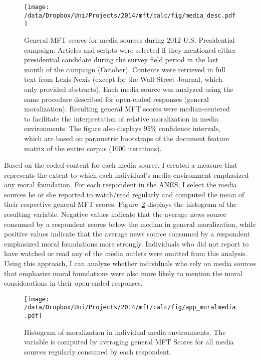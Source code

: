 \begin{figure}[ht]\centering
\texttt{[image: /data/Dropbox/Uni/Projects/2014/mft/calc/fig/media\_desc.pdf]}
\caption[General MFT scores for media sources during 2012 U.S. Presidential campaign]{General MFT scores for media sources during 2012 U.S. Presidential campaign. Articles and scripts were selected if they mentioned either presidential candidate during the survey field period in the last month of the campaign (October). Contents were retrieved in full text from Lexis-Nexis (except for the Wall Street Journal, which only provided abstracts). Each media source was analyzed using the same procedure described for open-ended responses (general moralization). Resulting general MFT scores were median-centered to facilitate the interpretation of relative moralization in media environments. The figure also displays 95\% confidence intervals, which are based on parametric bootstraps of the document feature matrix of the entire corpus (1000 iterations).}\label{fig:media_desc}
\end{figure}


Based on the coded content for each media source, I created a measure that represents the extent to which each individual's media environment emphasized any moral foundation. For each respondent in the ANES, I select the media sources he or she reported to watch/read regularly and computed the mean of their respective general MFT scores. Figure~\ref{fig:moralmedia} displays the histogram of the resulting variable. Negative values indicate that the average news source consumed by a respondent scores below the median in general moralization, while positive values indicate that the average news source consumed by a respondent emphasized moral foundations more strongly. Individuals who did not report to have watched or read any of the media outlets were omitted from this analysis. Using this approach, I can analyze whether individuals who rely on media sources that emphasize moral foundations were also more likely to mention the moral considerations in their open-ended responses. 

\begin{figure}[ht]\centering
\texttt{[image: /data/Dropbox/Uni/Projects/2014/mft/calc/fig/app\_moralmedia.pdf]}
\caption[Histogram of moralization in individual media environments]{Histogram of moralization in individual media environments. The variable is computed by averaging general MFT Scores for all media sources regularly consumed by each respondent.}\label{fig:moralmedia}
\end{figure}


